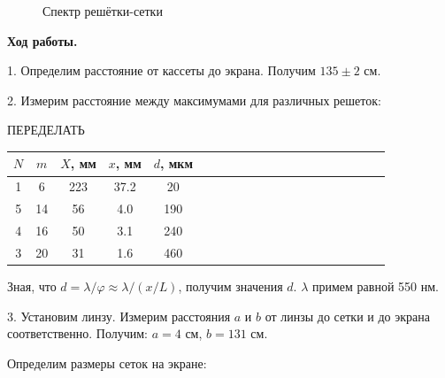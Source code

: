 \documentclass[14pt]{article}
\begin{document}
\begin{figure}[h!]
	\caption{Спектр решётки-сетки}
	\label{fig:image}
\end{figure}


\newpage
\textbf{Ход работы.}

1. Определим расстояние от кассеты до экрана. Получим $135 \pm 2$ см.

2. Измерим расстояние между максимумами для различных решеток:

\vspace{3cm}
ПЕРЕДЕЛАТЬ


\begin{center}
\begin{tabular}{|c|c|c|c|c|c|c|c|c|c|c|c|c|c|c|c|c|c|c|c|}
\hline
$N$		&	$m$		&	$X$, мм		&	$x$, мм		&	$d$, мкм		\\
\hline
1		&	6		&	223			&	37.2		&	20				\\
\hline
5		&	14		&	56			&	4.0			&	190				\\
\hline
4		&	16		&	50			&	3.1			&	240				\\
\hline
3		&	20		&	31			&	1.6			&	460				\\
\hline
\end{tabular}
\end{center}









Зная, что $d = \lambda/\varphi \approx \lambda/(x/L)$, получим значения $d$. $\lambda$ примем равной 550 нм.

\vspace{1cm}

3. Установим линзу. Измерим расстояния $a$ и $b$ от линзы до сетки и до экрана соответственно. Получим: $a = 4$ см, $b = 131$ см.

Определим размеры сеток на экране:
\end{document}
